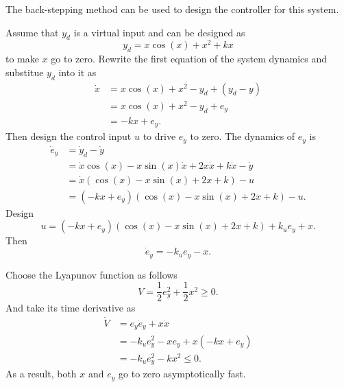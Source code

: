\documentclass[12pt,a4paper]{article}
\begin{document}
\indent The back-stepping method can be used to design the controller for this system.

\indent Assume that $y_d$ is a virtual input and can be designed as
\begin{equation}
y_d=x\cos(x)+x^2+kx
\end{equation}
to make $x$ go to zero. Rewrite the first equation of the system dynamics and substitue $y_d$ into it as
\begin{equation}
\begin{aligned}
\dot{x} &= x\cos(x)+x^2-y_d+(y_d-y) \\
        &= x\cos(x)+x^2-y_d+e_y \\
        &= -kx+e_y
        .
\end{aligned}
\end{equation}
Then design the control input $u$ to drive $e_y$ to zero. The dynamics of $e_y$ is
\begin{equation}
\begin{aligned}
\dot{e}_y &= \dot{y}_d-\dot{y}\\
          &= \dot{x}\cos(x)-x\sin(x)\dot{x}+2x\dot{x}+k\dot{x}-\dot{y} \\
          &= \dot{x}\left(\cos(x)-x\sin(x)+2x+k\right)-u \\
          &= (-kx+e_y)\left(\cos(x)-x\sin(x)+2x+k\right)-u 
          .
\end{aligned}
\end{equation}
Design 
\begin{equation}
u = (-kx+e_y)\left(\cos(x)-x\sin(x)+2x+k\right)+k_ue_y+x.
\end{equation}
Then 
\begin{equation}
\dot{e}_y=-k_ue_y-x.
\end{equation}

\indent Choose the Lyapunov function as follows
\begin{equation}
V=\frac{1}{2}e_y^2+\frac{1}{2}x^2 \ge 0.
\end{equation}
And take its time derivative as
\begin{equation}
\begin{aligned}
\dot{V} &= e_y\dot{e}_y+x\dot{x} \\
        &= -k_u e_y^2-xe_y+x(-kx+e_y) \\
        &= -k_u e_y^2-kx^2 \le 0
        .
\end{aligned}
\end{equation}
As a result, both $x$ and $e_y$ go to zero asymptotically fast.
\end{document}
